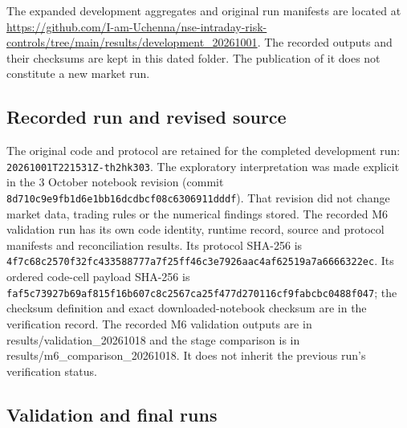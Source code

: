 \documentclass[11pt,a4paper]{article}
\begin{document}
The expanded development aggregates and original run manifests are located at \url{https://github.com/I-am-Uchenna/nse-intraday-risk-controls/tree/main/results/development_20261001}. The recorded outputs and their checksums are kept in this dated folder. The publication of it does not constitute a new market run.

\subsection*{Recorded run and revised source}

The original code and protocol are retained for the completed development run: \nolinkurl{20261001T221531Z-th2hk303}. The exploratory interpretation was made explicit in the 3 October notebook revision (commit \nolinkurl{8d710c9e9fb1d6e1bb16dcdbcf08c6306911dddf}). That revision did not change market data, trading rules or the numerical findings stored. The recorded M6 validation run has its own code identity, runtime record, source and protocol manifests and reconciliation results. Its protocol SHA-256 is \nolinkurl{4f7c68c2570f32fc433588777a7f25ff46c3e7926aac4af62519a7a6666322ec}. Its ordered code-cell payload SHA-256 is \nolinkurl{faf5c73927b69af815f16b607c8c2567ca25f477d270116cf9fabcbc0488f047}; the checksum definition and exact downloaded-notebook checksum are in the verification record. The recorded M6 validation outputs are in results/validation\_20261018 and the stage comparison is in results/m6\_comparison\_20261018. It does not inherit the previous run's verification status.


\subsection*{Validation and final runs}
\end{document}
